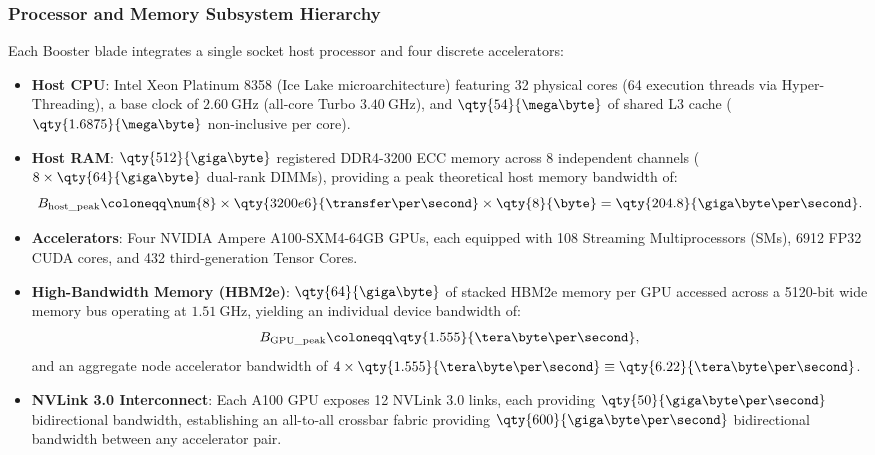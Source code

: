 \subsubsection*{Processor and Memory Subsystem Hierarchy}
Each Booster blade integrates a single socket host processor and
four discrete accelerators:
\begin{itemize}
  \item \textbf{Host CPU}: Intel Xeon Platinum 8358 (Ice Lake
    microarchitecture) featuring
    \num{32} physical cores (\num{64} execution threads via
    Hyper-Threading), a base clock
    of $\qty{2.60}{\giga\hertz}$ (all-core Turbo
    $\qty{3.40}{\giga\hertz}$), and $\qty{54}{\mega\byte}$
    of shared L3 cache ($\qty{1.6875}{\mega\byte}$ non-inclusive per core).
  \item \textbf{Host RAM}: $\qty{512}{\giga\byte}$ registered
    DDR4-3200 ECC memory across
    \num{8} independent channels ($8 \times \qty{64}{\giga\byte}$
    dual-rank DIMMs),
    providing a peak theoretical host memory bandwidth of:
    \begin{equation}
      B_{\mathrm{host\_peak}} \coloneqq \num{8} \times
      \qty{3200e6}{\transfer\per\second} \times \qty{8}{\byte}
      = \qty{204.8}{\giga\byte\per\second}.
      \label{eq:supp_host_bandwidth}
    \end{equation}
  \item \textbf{Accelerators}: Four NVIDIA Ampere A100-SXM4-64GB
    \acp{GPU}, each equipped with
    \num{108} Streaming Multiprocessors (SMs), \num{6912} FP32 CUDA
    cores, and \num{432}
    third-generation Tensor Cores.
  \item \textbf{High-Bandwidth Memory (HBM2e)}:
    $\qty{64}{\giga\byte}$ of stacked HBM2e
    memory per \ac{GPU} accessed across a \num{5120}-bit wide memory
    bus operating at
    $\qty{1.51}{\giga\hertz}$, yielding an individual device bandwidth of:
    \begin{equation}
      B_{\mathrm{GPU\_peak}} \coloneqq \qty{1.555}{\tera\byte\per\second},
      \label{eq:supp_gpu_bandwidth}
    \end{equation}
    and an aggregate node accelerator bandwidth of $4 \times
    \qty{1.555}{\tera\byte\per\second}
    \equiv \qty{6.22}{\tera\byte\per\second}$.
  \item \textbf{NVLink 3.0 Interconnect}: Each A100 \ac{GPU} exposes
    \num{12} NVLink 3.0
    links, each providing $\qty{50}{\giga\byte\per\second}$
    bidirectional bandwidth,
    establishing an all-to-all crossbar fabric providing
    $\qty{600}{\giga\byte\per\second}$
    bidirectional bandwidth between any accelerator pair.
\end{itemize}

